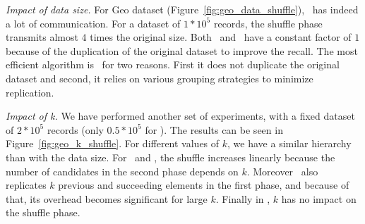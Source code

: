 \emph{Impact of data size.} For Geo dataset (Figure~\ref{fig:geo_data_shuffle}), \HBNLJ~has indeed a lot of 
communication. For a dataset of $1*10^5$ records, the shuffle phase transmits almost $4$ times the original size.
Both \LSH~and \Z~have a constant factor of $1$ because of the duplication of the original 
dataset
to improve the recall. The most efficient algorithm is \VO~for two reasons. First it does not duplicate the 
original dataset and second, it relies on various grouping strategies to minimize replication.

\emph{Impact of k.}
We have performed another set of experiments, with a fixed dataset of $2*10^5$ records (only $0.5*10^5$ for \HBNLJ). 
The results can be seen in Figure~\ref{fig:geo_k_shuffle}. For different values of $k$, we have a similar hierarchy 
than with the data size. For \LSH~and \Z, the shuffle increases linearly because the number of candidates in the second 
phase depends on $k$. Moreover \Z~also replicates $k$ previous and succeeding elements in the first phase, and because 
of that, its overhead becomes significant for large $k$. Finally in \VO, $k$ has no impact on the shuffle phase.
